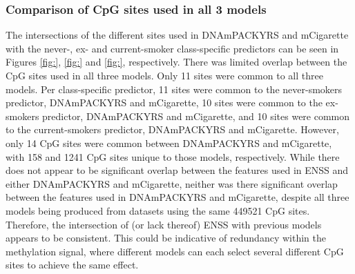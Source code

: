 \documentclass{article} %
\begin{document}

\subsubsection{Comparison of CpG sites used in all 3 models} \label{sec:sites-comparison}
The intersections of the different sites used in DNAmPACKYRS and mCigarette with the never-, ex- and current-smoker class-specific predictors can be seen in Figures \ref{fig:}, \ref{fig:} and \ref{fig:}, respectively. There was limited overlap between the CpG sites used in all three models. Only 11 sites were common to all three models. Per class-specific predictor, 11 sites were common to the never-smokers predictor, DNAmPACKYRS and mCigarette, 10 sites were common to the ex-smokers predictor, DNAmPACKYRS and mCigarette, and 10 sites were common to the current-smokers predictor, DNAmPACKYRS and mCigarette. However, only 14 CpG sites were common between DNAmPACKYRS and mCigarette, with 158 and 1241 CpG sites unique to those models, respectively. While there does not appear to be significant overlap between the features used in ENSS and either DNAmPACKYRS and mCigarette, neither was there significant overlap between the features used in DNAmPACKYRS and mCigarette, despite all three models being produced from datasets using the same \num{449521} CpG sites. Therefore, the intersection of (or lack thereof) ENSS with previous models appears to be consistent. This could be indicative of redundancy within the methylation signal, where different models can each select several different CpG sites to achieve the same effect.
\end{document}
